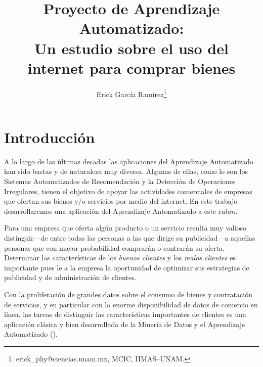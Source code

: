 \documentclass[twocolumn, letterpaper,11pt]{article}
\begin{document}
\title{Proyecto de Aprendizaje Automatizado:\\
{\Large Un estudio sobre el uso del internet para comprar bienes}}
\author{Erick García Ramírez\footnote{
erick\_phy@ciencias.unam.mx, MCIC, IIMAS--UNAM.}}

\maketitle
\begin{abstract}
\noindent 
\end{abstract}


\section{Introducción}
A lo largo de las últimas decadas las aplicaciones del Aprendizaje Automatizado han sido bastas y de
naturaleza muy diversa. Algunas de ellas, como lo son los Sistemas Automatizados de Recomendación y la Detección de
Operaciones Irregulares, tienen el objetivo de apoyar las actividades comerciales de empresas que ofertan
sus bienes y/o servicios por medio del internet. En este trabajo desarrollaremos una aplicación del Aprendizaje
Automatizado a este rubro.

Para una empresa que oferta algún producto o un servicio resulta muy valioso distinguir---de entre todas
las personas a las que dirige su publicidad---a aquellas personas que con mayor probabilidad comprarán o
contrarán su oferta. Determinar las características de los \emph{buenos clientes} y los \emph{malos clientes} es importante pues 
le a la empresa la oportunidad de optimizar sus estrategias de publicidad y de administración de clientes. 

Con la proliferación de grandes datos sobre el consumo de bienes y contratación de servicios, y en particular con la enorme
disponibilidad de datos de comercio en línea, las tareas de distinguir las características importantes de clientes es
una aplicación clásica y bien desarrollada de la Minería de Datos y el Aprendizaje Automatizado (\cite[Capítulo I]{berry}).  
\end{document}
